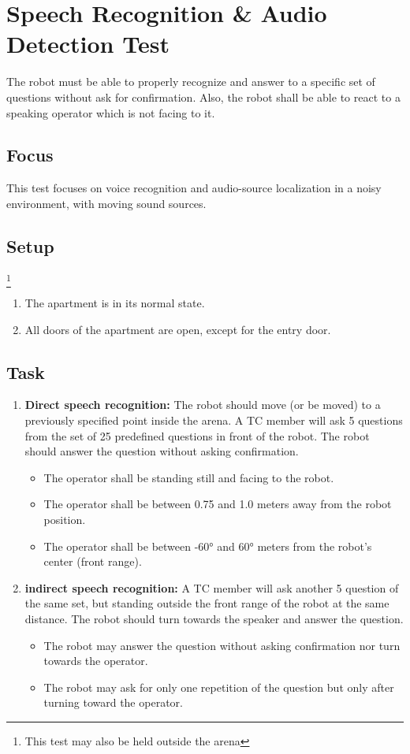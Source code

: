 \section{Speech Recognition \& Audio Detection Test}

The robot must be able to properly recognize and answer to a specific set of questions without ask for confirmation. Also, the robot shall be able to react to a speaking operator which is not facing to it.

\subsection{Focus}

This test focuses on voice recognition and audio-source localization in a noisy environment, with moving sound sources.

\subsection{Setup} \footnote{This test may also be held outside the arena}
\begin{enumerate}
\item The apartment is in its normal state.
\item All doors of the apartment are open, except for the entry door. 
\end{enumerate}

\subsection{Task}

\begin{enumerate}
\item \textbf{Direct speech recognition: } The robot should move (or be moved) to a previously specified point inside the arena. A TC member will ask 5 questions from the set of 25 predefined questions in front of the robot. The robot should answer the question without asking confirmation.
\begin{itemize}
\item The operator shall be standing still and facing to the robot.
\item The operator shall be between 0.75 and 1.0 meters away from the robot position.
\item The operator shall be between -60° and 60° meters from the robot's center (front range).
\end{itemize}
\item \textbf{indirect speech recognition: } A TC member will ask another 5 question of the same set, but standing outside the front range of the robot at the same distance. The robot should turn towards the speaker and answer the question.
\begin{itemize}
\item The robot may answer the question without asking confirmation nor turn towards the operator.
\item The robot may ask for only one repetition of the question but only after turning toward the operator.
\end{itemize}
\end{enumerate}


